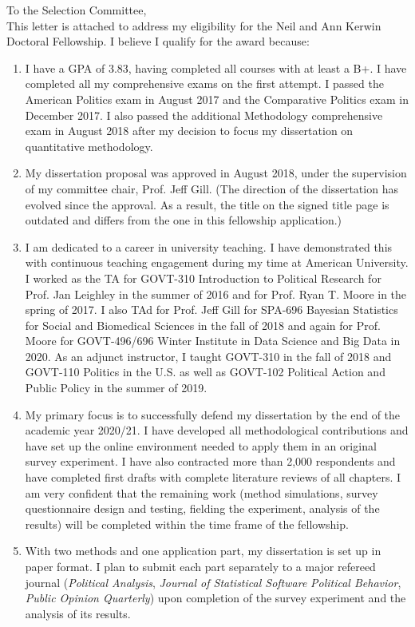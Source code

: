 



\noindent To the Selection Committee, \\

This letter is attached to address my eligibility for the Neil and Ann Kerwin Doctoral Fellowship. I believe I qualify for the award because:

\begin{enumerate}
	\item I have a GPA of 3.83, having completed all courses with at least a B+. I have completed all my comprehensive exams on the first attempt. I passed the American Politics exam in August 2017 and the Comparative Politics exam in December 2017. I also passed the additional Methodology comprehensive exam in August 2018 after my decision to focus my dissertation on quantitative methodology.
	\item My dissertation proposal was approved in August 2018, under the supervision of my committee chair, Prof. Jeff Gill. (The direction of the dissertation has evolved since the approval. As a result, the title on the signed title page is outdated and differs from the one in this fellowship application.)
	\item I am dedicated to a career in university teaching. I have demonstrated this with continuous teaching engagement during my time at American University. I worked as the TA for GOVT-310 Introduction to Political Research for Prof. Jan Leighley in the summer of 2016 and for Prof. Ryan T. Moore in the spring of 2017. I also TAd for Prof. Jeff Gill for SPA-696 Bayesian Statistics for Social and Biomedical Sciences in the fall of 2018 and again for Prof. Moore for GOVT-496/696 Winter Institute in Data Science and Big Data in 2020. As an adjunct instructor, I taught GOVT-310 in the fall of 2018 and GOVT-110 Politics in the U.S. as well as GOVT-102 Political Action and Public Policy in the summer of 2019.
	\item My primary focus is to successfully defend my dissertation by the end of the academic year 2020/21. I have developed all methodological contributions and have set up the online environment needed to apply them in an original survey experiment. I have also contracted more than 2,000 respondents and have completed first drafts with complete literature reviews of all chapters. I am very confident that the remaining work (method simulations, survey questionnaire design and testing, fielding the experiment, analysis of the results) will be completed within the time frame of the fellowship.
	\item With two methods and one application part, my dissertation is set up in paper format. I plan to submit each part separately to a major refereed journal (\textit{Political Analysis}, \textit{Journal of Statistical Software} \textit{Political Behavior}, \textit{Public Opinion Quarterly}) upon completion of the survey experiment and the analysis of its results.
\end{enumerate}

